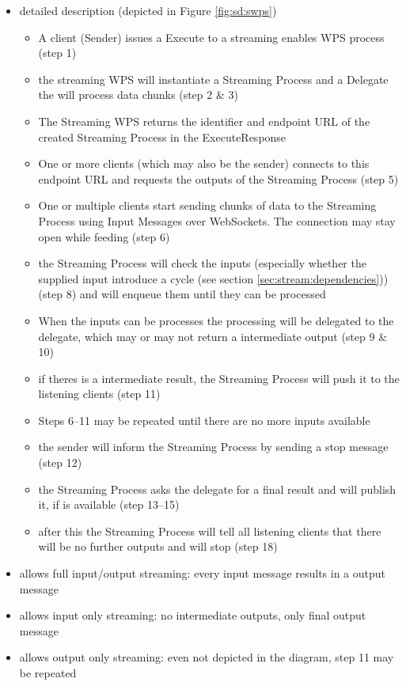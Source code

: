 \begin{itemize}
			\item detailed description (depicted in Figure \ref{fig:sd:swps})
			\begin{itemize}
				\item A client (Sender) issues a Execute to a streaming enables WPS process (step 1)
				\item the streaming WPS will instantiate a Streaming Process and a Delegate the will process data chunks (step 2 \& 3)
				\item The Streaming WPS returns the identifier and endpoint URL of the created Streaming Process in the ExecuteResponse
				\item One or more clients (which may also be the sender) connects to this endpoint URL and requests the outputs of the Streaming Process (step 5)
				\item One or multiple clients start sending chunks of data to the Streaming Process using Input Messages over WebSockets. The connection may stay open while feeding (step 6)
				\item the Streaming Process will check the inputs (especially whether the supplied input introduce a cycle (see section \ref{sec:stream:dependencies})) (step 8) and will enqueue them until they can be processed
				\item When the inputs can be processes the processing will be delegated to the delegate, which may or may not return a intermediate output  (step 9 \& 10)
				\item if theres is a intermediate result, the Streaming Process will push it to the listening clients (step 11)
				\item Steps 6--11 may be repeated until there are no more inputs available
				\item the sender will inform the Streaming Process by sending a stop message (step 12)
				\item the Streaming Process asks the delegate for a final result and will publish it, if is available (step 13--15)
				\item after this the Streaming Process will tell all listening clients that there will be no further outputs and will stop (step 18)
			\end{itemize}
			\item allows full input/output streaming: every input message results in a output message
			\item allows input only streaming: no intermediate outputs, only final output message
			\item allows output only streaming: even not depicted in the diagram, step 11 may be repeated

\end{itemize}
